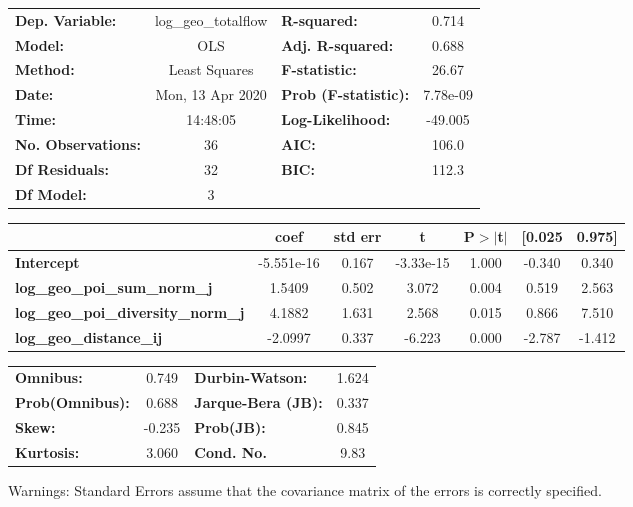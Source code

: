 \begin{center}
\begin{tabular}{lclc}
\toprule
\textbf{Dep. Variable:}                    & log\_geo\_totalflow & \textbf{  R-squared:         } &     0.714   \\
\textbf{Model:}                            &         OLS         & \textbf{  Adj. R-squared:    } &     0.688   \\
\textbf{Method:}                           &    Least Squares    & \textbf{  F-statistic:       } &     26.67   \\
\textbf{Date:}                             &   Mon, 13 Apr 2020  & \textbf{  Prob (F-statistic):} &  7.78e-09   \\
\textbf{Time:}                             &       14:48:05      & \textbf{  Log-Likelihood:    } &   -49.005   \\
\textbf{No. Observations:}                 &            36       & \textbf{  AIC:               } &     106.0   \\
\textbf{Df Residuals:}                     &            32       & \textbf{  BIC:               } &     112.3   \\
\textbf{Df Model:}                         &             3       & \textbf{                     } &             \\
\bottomrule
\end{tabular}
\begin{tabular}{lcccccc}
                                           & \textbf{coef} & \textbf{std err} & \textbf{t} & \textbf{P$> |$t$|$} & \textbf{[0.025} & \textbf{0.975]}  \\
\midrule
\textbf{Intercept}                         &   -5.551e-16  &        0.167     & -3.33e-15  &         1.000        &       -0.340    &        0.340     \\
\textbf{log\_geo\_poi\_sum\_norm\_j}       &       1.5409  &        0.502     &     3.072  &         0.004        &        0.519    &        2.563     \\
\textbf{log\_geo\_poi\_diversity\_norm\_j} &       4.1882  &        1.631     &     2.568  &         0.015        &        0.866    &        7.510     \\
\textbf{log\_geo\_distance\_ij}            &      -2.0997  &        0.337     &    -6.223  &         0.000        &       -2.787    &       -1.412     \\
\bottomrule
\end{tabular}
\begin{tabular}{lclc}
\textbf{Omnibus:}       &  0.749 & \textbf{  Durbin-Watson:     } &    1.624  \\
\textbf{Prob(Omnibus):} &  0.688 & \textbf{  Jarque-Bera (JB):  } &    0.337  \\
\textbf{Skew:}          & -0.235 & \textbf{  Prob(JB):          } &    0.845  \\
\textbf{Kurtosis:}      &  3.060 & \textbf{  Cond. No.          } &     9.83  \\
\bottomrule
\end{tabular}
\end{center}

Warnings: \newline
 [1] Standard Errors assume that the covariance matrix of the errors is correctly specified.